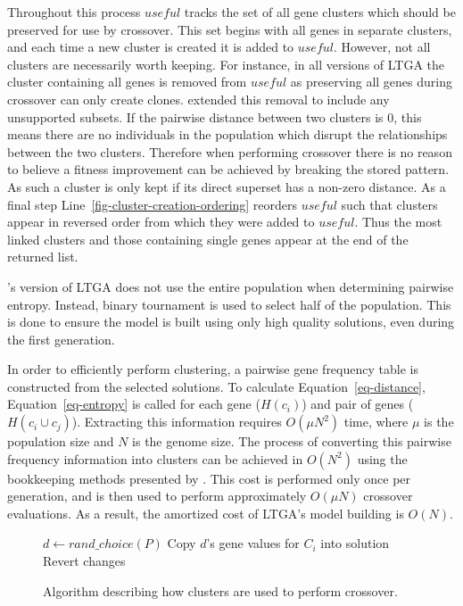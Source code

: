 \documentclass[twoside]{article}
\begin{document}
Throughout this process $useful$ tracks the set of all gene clusters which should be preserved for use by crossover.
This set begins with all genes in separate clusters, and each time a new cluster is created it is added to $useful$.
However, not all clusters are necessarily worth keeping. For instance, in all versions of LTGA the cluster
containing all genes is removed from $useful$ as preserving all genes during crossover can only create clones.
\cite{thierens:2013:ltgahiff} extended this removal to include any unsupported subsets. If the pairwise distance
between two clusters is 0, this means there are no individuals in the population which disrupt the relationships between the two
clusters. Therefore when performing crossover there is no reason to believe a fitness improvement can be achieved
by breaking the stored pattern. As such a cluster is only kept if its direct superset has a non-zero distance.
As a final step Line~\ref{fig-cluster-creation-ordering} reorders $useful$ such that clusters appear in reversed
order from which they were added to $useful$. Thus the most linked clusters and those containing single genes
appear at the end of the returned list.

\cite{thierens:2013:ltgahiff}'s version of LTGA does not use the entire population when determining pairwise entropy.
Instead, binary tournament is used to select half of the population. This is done to ensure the model is built
using only high quality solutions, even during the first generation.

In order to efficiently perform clustering, a pairwise gene frequency table is constructed from the selected solutions.
To calculate Equation~\ref{eq-distance}, Equation~\ref{eq-entropy} is called for each
gene ($H(c_i)$) and pair of genes ($H(c_i \cup c_j)$). Extracting this information requires $O(\mu N^2)$
time, where $\mu$ is the population size and $N$ is the genome size. The process of converting
this pairwise frequency information into clusters can be achieved in $O(N^2)$ using the bookkeeping
methods presented by \cite{gronau:2007:upgma}. This cost is performed only once per generation,
and is then used to perform approximately $O(\mu N)$ crossover evaluations. As a result, the amortized cost of
LTGA's model building is $O(N)$.

\begin{figure}
  \begin{algorithmic}[1]
        \State $d \leftarrow rand\_choice(P)$\label{fig-cluster-usage-donate}
        \State Copy $d$'s gene values for $C_i$ into solution
            \State Revert changes
          \EndIf
        \EndIf
    \EndFor
  \EndProcedure
\end{algorithmic}
  \caption{Algorithm describing how clusters are used to perform crossover.}
  \label{fig-cluster-usage}
\end{figure}
\end{document}

